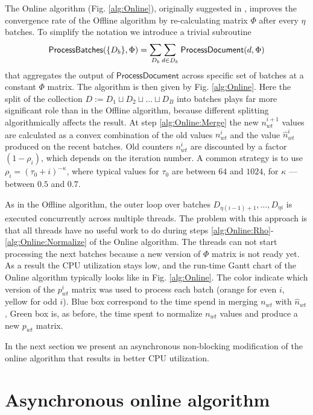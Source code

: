 \documentclass[russian,english]{llncs}
\newcommand{\kw}[1]{\textsf{#1}}
\begin{document}
The \kw{Online algorithm} (Fig. \ref{alg:Online}), originally suggested in \cite{hoffman10online},
improves the convergence rate of the \kw{Offline algorithm}
by re-calculating matrix $\Phi$ after every $\eta$ batches.
To simplify the notation
we introduce a trivial subroutine
\[
\kw{ProcessBatches}(\{D_b\}, \Phi) = \mathlarger\sum\limits_{D_b} \mathlarger\sum\limits_{d \in D_b} \; \kw{ProcessDocument}(d, \Phi) \\
\]
that aggregates the output of $\kw{ProcessDocument}$ across specific set of batches at a constant $\Phi$ matrix.
The algorithm is then given by Fig. \ref{alg:Online}.
Here the split of the collection $D := D_1 \sqcup D_2 \sqcup \dots \sqcup D_B$
into batches
plays far more significant role than in the \kw{Offline algorithm},
because different splitting algorithmically affects the result.
At step \ref{alg:Online:Merge} the new $n_{wt}^{i+1}$ values are calculated as a convex combination
of the old values $n_{wt}^{i}$ and the value $\hat n_{wt}^{i}$ produced on the recent batches.
Old counters $n_{wt}^{i}$ are discounted by a factor $(1 - \rho_i)$,
which depends on the iteration number. A common strategy is to use $\rho_i = (\tau_0 + i)^{-\kappa}$,
where typical values for $\tau_0$ are between $64$ and $1024$, for $\kappa$ --- between $0.5$ and $0.7$.

As in the \kw{Offline algorithm}, the outer loop over batches
$D_{\eta (i - 1) + 1}, \dots, D_{\eta i}$ is executed concurrently across multiple threads.
The problem with this approach is that all threads have no useful work to do during steps
\ref{alg:Online:Rho}-\ref{alg:Online:Normalize} of the \kw{Online algorithm}.
The threads can not start processing the next batches because a new version of $\Phi$ matrix is not ready yet.
As a result the CPU utilization stays low, and the run-time Gantt chart of the \kw{Online algorithm} typically looks like in Fig. \ref{alg:Online}.
The color indicate which version of the $p^i_{wt}$ matrix was used to process each batch
(orange for even $i$, yellow for odd $i$).
Blue box correspond to the time spend in merging $n_{wt}$ with $\hat n_{wt}$,
Green box is, as before, the time spent to normalize $n_{wt}$ values and produce a new $p_{wt}$ matrix.

In the next section we present an asynchronous non-blocking modification of the online algorithm that results in better CPU utilization.

\section{Asynchronous online algorithm}
\label{sec:AsyncOnline}
\end{document}

